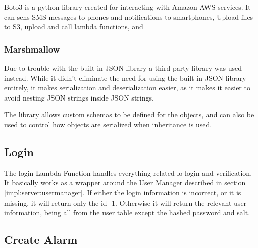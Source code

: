 Boto3 is a python library created for interacting with Amazon AWS services. It can sens SMS messages to phones and notifications to smartphones, Upload files to S3, upload and call lambda functions, and 

\iffalse
The SNS library contains functions for creating, updating and calling endpoints for smartphones. This is used for when the lambda function needs to send a notification to the contacts smartphone, and works as a wrapper around AWS SNS.

Since Android phones can change their device ID, the system also needs a way to update the endpoint, otherwise the contact may not be reachable when needed.

the library just sends a string to the Android phone, and can thus be send anything as long as the Android device knows how to parse it.

The library can also be extended to create endpoints for other device types such as iPhones. It just needs to point to the new ARN endpoint instead.
\fi

\subsubsection{Marshmallow}

Due to trouble with the built-in JSON library a third-party library was used instead. While it didn't eliminate the need for using the built-in JSON library entirely, it makes serialization and deserialization easier, as it makes it easier to avoid nesting JSON strings inside JSON strings.

The library allows custom schemas to be defined for the objects, and can also be used to control how objects are serialized when inheritance is used.




\subsection{Login}

The login Lambda Function handles everything related lo login and verification. It basically works as a wrapper around the User Manager described in section \ref{impl:server:usermanager}. 
If either the login information is incorrect, or it is missing, it will return only the id -1. Otherwise it will return the relevant user information, being all from the user table except the hashed password and salt.


\subsection{Create Alarm}


